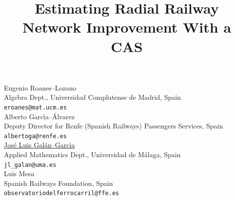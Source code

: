 \documentclass[article,A4,11pt]{llncs}%
\begin{document}
\title{Estimating Radial Railway Network Improvement With a CAS}
 \author{} \institute{}
\maketitle
\begin{center}
{\large Eugenio Roanes--Lozano}\\
Algebra Dept., Universidad Complutense de Madrid, Spain\\
{\tt eroanes@mat.ucm.es}
\\ \vspace{4mm}
{\large Alberto Garc\'{\i}a--\'Alvarez}\\
Deputy Director for Renfe (Spanish Railways) Passengers Services, Spain\\
{\tt albertoga@renfe.es}
\\ \vspace{4mm}
{\large \underline{Jos\'e Luis Gal\'an--Garc\'{\i}a}}\\
Applied Mathematics Dept., Universidad de M\'alaga, Spain\\
{\tt jl\_galan@uma.es}
\\ \vspace{4mm}
{\large Luis Mesa}\\
Spanish Railways Foundation, Spain\\
{\tt observatoriodelferrocarril@ffe.es}
\end{center}
\end{document}
